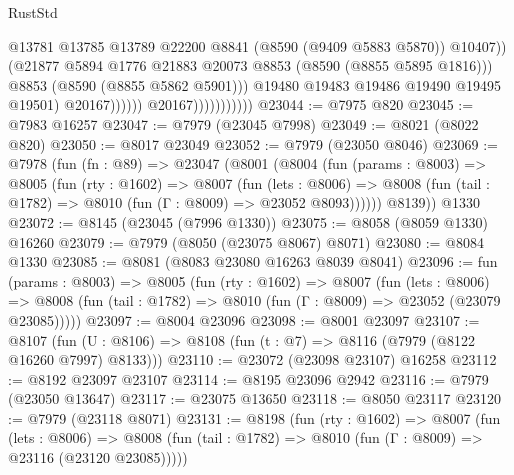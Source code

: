 \begin{lexlean}{RustStd}
\begin{coremodule}
                                              @13781
                                              @13785
                                              @13789
                                              @22200
                                              @8841
                                              (@8590 (@9409 @5883 @5870))
                                              @10407))
                                          (@21877
                                            @5894
                                            @1776
                                            @21883
                                            @20073
                                            @8853
                                            (@8590 (@8855 @5895 @1816)))
                                          @8853
                                          (@8590 (@8855 @5862 @5901)))
                                        @19480
                                        @19483
                                        @19486
                                        @19490
                                        @19495
                                        @19501)
                                      @20167))))))
                          @20167)))))))))))
@23044 := @7975 @820
@23045 := @7983 @16257
@23047 := @7979 (@23045 @7998)
@23049 := @8021 (@8022 @820)
@23050 := @8017 @23049
@23052 := @7979 (@23050 @8046)
@23069 := @7978
    (fun (fn : @89) =>
    @23047
      (@8001
        (@8004
          (fun (params : @8003) =>
          @8005
            (fun (rty : @1602) =>
            @8007
              (fun (lets : @8006) =>
              @8008 (fun (tail : @1782) => @8010 (fun (Γ : @8009) => @23052 @8093))))))
        @8139))
    @1330
@23072 := @8145 (@23045 (@7996 @1330))
@23075 := @8058 (@8059 @1330) @16260
@23079 := @7979 (@8050 (@23075 @8067) @8071)
@23080 := @8084 @1330
@23085 := @8081 (@8083 @23080 @16263 @8039 @8041)
@23096 := fun (params : @8003) =>
  @8005
    (fun (rty : @1602) =>
    @8007
      (fun (lets : @8006) =>
      @8008 (fun (tail : @1782) => @8010 (fun (Γ : @8009) => @23052 (@23079 @23085)))))
@23097 := @8004 @23096
@23098 := @8001 @23097
@23107 := @8107
    (fun (U : @8106) => @8108 (fun (t : @7) => @8116 (@7979 (@8122 @16260 @7997) @8133)))
@23110 := @23072 (@23098 @23107) @16258
@23112 := @8192 @23097 @23107
@23114 := @8195 @23096 @2942
@23116 := @7979 (@23050 @13647)
@23117 := @23075 @13650
@23118 := @8050 @23117
@23120 := @7979 (@23118 @8071)
@23131 := @8198
    (fun (rty : @1602) =>
    @8007
      (fun (lets : @8006) =>
      @8008 (fun (tail : @1782) => @8010 (fun (Γ : @8009) => @23116 (@23120 @23085)))))

\end{coremodule}
\end{lexlean}
